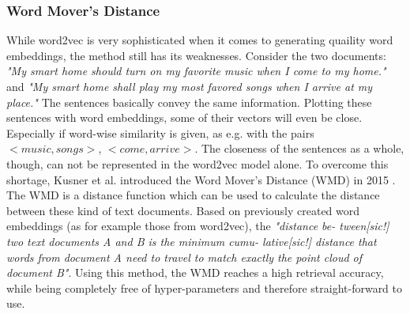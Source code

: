\subsubsection{Word Mover's Distance} %
\label{sub:word_movers_distance}
While word2vec is very sophisticated when it comes to generating quaility word embeddings, the method still has its weaknesses. Consider the two documents: \emph{"My smart home should turn on my favorite music when I come to my home."} and \emph{"My smart home shall play my most favored songs when I arrive at my place."} The sentences basically convey the same information. Plotting these sentences with word embeddings, some of their vectors will even be close. Especially if word-wise similarity is given, as e.g. with the pairs $< music, songs>$, $<come, arrive>$. The closeness of the sentences as a whole, though, can not be represented in the word2vec model alone. To overcome this shortage, Kusner et al. introduced the Word Mover's Distance (WMD) in 2015 \cite{kusner_word_2015}. The WMD is a distance function which can be used to calculate the distance between these kind of text documents. Based on previously created word embeddings (as for example those from word2vec), the \textit{"distance be- tween[sic!] two text documents A and B is the minimum cumu- lative[sic!] distance that words from document A need to travel to match exactly the point cloud of document B"}\cite[p2]{kusner_word_2015}. Using this method, the WMD reaches a high retrieval accuracy, while being completely free of hyper-parameters and therefore straight-forward to use.